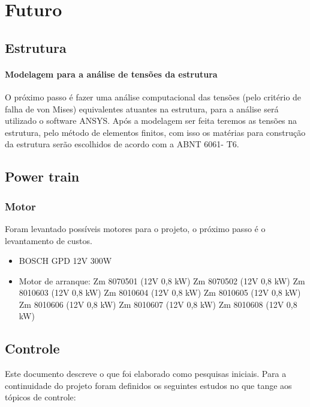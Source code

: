 \chapter[Futuro]{Futuro}

\section{Estrutura}

\subsubsection{Modelagem para a análise de tensões da estrutura}

O próximo passo é fazer uma análise computacional das tensões (pelo critério de falha de von Mises) equivalentes atuantes na estrutura, para a análise  será utilizado o software ANSYS. Após a modelagem ser feita teremos as tensões na estrutura, pelo método de elementos finitos, com isso os matérias para construção da estrutura serão escolhidos de acordo com a  ABNT 6061- T6.

\section{Power train}

\subsection{Motor}

Foram levantado possíveis motores para o projeto, o próximo passo é o levantamento de custos.

\begin{itemize}
 \item BOSCH GPD 12V 300W
 \item Motor de arranque:
  \rightarrow Zm 8070501 (12V 0,8 kW)
  \rightarrow Zm 8070502 (12V 0,8 kW)
  \rightarrow Zm 8010603 (12V 0,8 kW)
  \rightarrow Zm 8010604 (12V 0,8 kW)
  \rightarrow Zm 8010605 (12V 0,8 kW)
  \rightarrow Zm 8010606 (12V 0,8 kW)
  \rightarrow Zm 8010607 (12V 0,8 kW)
  \rightarrow Zm 8010608 (12V 0,8 kW)
\end{itemize}

\section{Controle}

Este documento descreve o que foi elaborado como pesquisas iniciais. Para a continuidade do projeto foram definidos os  seguintes estudos no que tange aos tópicos de controle:

